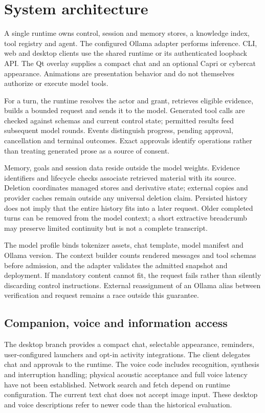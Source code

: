 \documentclass[11pt]{article}
\begin{document}
\section{System architecture}
A single runtime owns control, session and memory stores, a knowledge index, tool registry and agent. The configured Ollama adapter performs inference. CLI, web and desktop clients use the shared runtime or its authenticated loopback API. The Qt overlay supplies a compact chat and an optional Capri or cybercat appearance. Animations are presentation behavior and do not themselves authorize or execute model tools.

For a turn, the runtime resolves the actor and grant, retrieves eligible evidence, builds a bounded request and sends it to the model. Generated tool calls are checked against schemas and current control state; permitted results feed subsequent model rounds. Events distinguish progress, pending approval, cancellation and terminal outcomes. Exact approvals identify operations rather than treating generated prose as a source of consent.

Memory, goals and session data reside outside the model weights. Evidence identifiers and lifecycle checks associate retrieved material with its source. Deletion coordinates managed stores and derivative state; external copies and provider caches remain outside any universal deletion claim. Persisted history does not imply that the entire history fits into a later request. Older completed turns can be removed from the model context; a short extractive breadcrumb may preserve limited continuity but is not a complete transcript.

The model profile binds tokenizer assets, chat template, model manifest and Ollama version. The context builder counts rendered messages and tool schemas before admission, and the adapter validates the admitted snapshot and deployment. If mandatory content cannot fit, the request fails rather than silently discarding control instructions. External reassignment of an Ollama alias between verification and request remains a race outside this guarantee.

\subsection{Companion, voice and information access}
The desktop branch provides a compact chat, selectable appearance, reminders, user-configured launchers and opt-in activity integrations. The client delegates chat and approvals to the runtime. The voice code includes recognition, synthesis and interruption handling; physical acoustic acceptance and full voice latency have not been established. Network search and fetch depend on runtime configuration. The current text chat does not accept image input. These desktop and voice descriptions refer to newer code than the historical evaluation.
\end{document}
